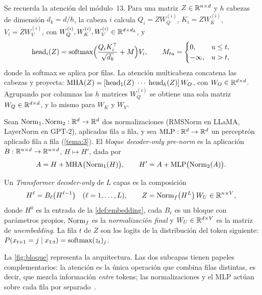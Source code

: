 Se recuerda la atención del módulo~13. Para una matriz $Z\in\mathbb{R}^{n\times d}$ y $h$ cabezas de dimensión $d_k=d/h$, la cabeza $i$ calcula $Q_i=ZW_Q^{(i)}$, $K_i=ZW_K^{(i)}$, $V_i=ZW_V^{(i)}$, con $W_Q^{(i)},W_K^{(i)},W_V^{(i)}\in\mathbb{R}^{d\times d_k}$, y
\[
\operatorname{head}_i(Z)=\operatorname{softmax}\Bigl(\frac{Q_iK_i^{\top}}{\sqrt{d_k}}+M\Bigr)V_i,\qquad
M_{tu}=\begin{cases}0,& u\le t,\\ -\infty,& u>t,\end{cases}
\]
donde la softmax se aplica por filas. La atención multicabeza concatena las cabezas y proyecta: $\operatorname{MHA}(Z)=[\operatorname{head}_1(Z)\;\cdots\;\operatorname{head}_h(Z)]\,W_O$, con $W_O\in\mathbb{R}^{d\times d}$. Agrupando por columnas las $h$ matrices $W_Q^{(i)}$ se obtiene una sola matriz $W_Q\in\mathbb{R}^{d\times d}$, y lo mismo para $W_K$ y $W_V$.

\begin{definicion}\label{def:bloque}
Sean $\operatorname{Norm}_1,\operatorname{Norm}_2:\mathbb{R}^{d}\to\mathbb{R}^{d}$ dos normalizaciones (RMSNorm en LLaMA, LayerNorm en GPT-2), aplicadas fila a fila, y sea $\operatorname{MLP}:\mathbb{R}^{d}\to\mathbb{R}^{d}$ un perceptrón aplicado fila a fila (\cref{tema:3}). El \emph{bloque decoder-only pre-norm} es la aplicación $B:\mathbb{R}^{n\times d}\to\mathbb{R}^{n\times d}$, $H\mapsto H'$, dada por
\[
A=H+\operatorname{MHA}\bigl(\operatorname{Norm}_1(H)\bigr),\qquad H'=A+\operatorname{MLP}\bigl(\operatorname{Norm}_2(A)\bigr).
\]
\end{definicion}

\begin{definicion}\label{def:transformer}
Un \emph{Transformer decoder-only} de $L$ capas es la composición
\[
H^{\ell}=B_\ell\bigl(H^{\ell-1}\bigr)\quad(\ell=1,\dots,L),\qquad Z=\operatorname{Norm}_f\bigl(H^{L}\bigr)\,W_U\in\mathbb{R}^{n\times V},
\]
donde $H^{0}$ es la entrada de la \cref{def:embedding}, cada $B_\ell$ es un bloque con parámetros propios, $\operatorname{Norm}_f$ es la \emph{normalización final} y $W_U\in\mathbb{R}^{d\times V}$ es la matriz de \emph{unembedding}. La fila $t$ de $Z$ son los logits de la distribución del token siguiente: $P(x_{t+1}=j\mid x_{1:t})=\operatorname{softmax}(z_t)_j$.
\end{definicion}

La \cref{fig:bloque} representa la arquitectura. Las dos subcapas tienen papeles complementarios: la atención es la única operación que combina filas distintas, es decir, que mezcla información \emph{entre} tokens; las normalizaciones y el MLP actúan sobre cada fila por separado~\cite[§7.2]{jm3}.

\addtocounter{figure}{1}%

